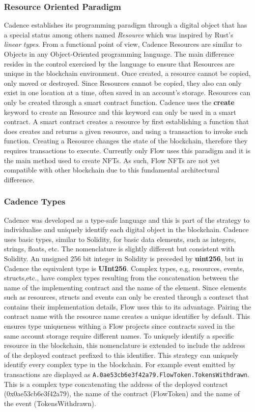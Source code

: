\documentclass[../NFTComp_IEEE.tex]{subfiles}
\begin{document}
\subsubsection{Resource Oriented Paradigm}
Cadence establishes its programming paradigm through a digital object that has a special status among others named \textit{Resource} which was inspired by Rust's \textit{linear types}. From a functional point of view, Cadence Resources are similar to Objects in any Object-Oriented programming language. The main difference resides in the control exercised by the language to ensure that Resources are unique in the blockchain environment. Once created, a resource cannot be copied, only moved or destroyed. Since Resources cannot be copied, they also can only exist in one location at a time, often saved in an account's storage. Resources can only be created through a smart contract function. Cadence uses the \textbf{create} keyword to create an Resource and this keyword can only be used in a smart contract. A smart contract creates a resource by first establishing a function that does creates and returns a given resource, and using a transaction to invoke such function. Creating a Resource changes the state of the blockchain, therefore they requires transactions to execute. Currently only Flow uses this paradigm and it is the main method used to create NFTs. As such, Flow NFTs are not yet compatible with other blockchain due to this fundamental architectural difference.

\subsubsection{Cadence Types}
Cadence was developed as a type-safe language and this is part of the strategy to individualise and uniquely identify each digital object in the blockchain. Cadence uses basic types, similar to Solidity, for basic data elements, such as integers, strings, floats, etc. The nomenclature is slightly different but consistent with Solidity. An unsigned 256 bit integer in Solidity is preceded by \textbf{uint256}, but in Cadence the equivalent type is \textbf{UInt256}. Complex types, e.g, resources, events, structs,etc., have complex types resulting from the concatenation between the name of the implementing contract and the name of the element. Since elements such as resources, structs and events can only be created through a contract that contains their implementation details, Flow uses this to its advantage. Pairing the contract name with the resource name creates a unique identifier by default. This ensures type uniqueness withing a Flow projects since contracts saved in the same account storage require different names. To uniquely identify a specific resource in the blockchain, this nomenclature is extended to include the address of the deployed contract prefixed to this identifier. This strategy can uniquely identify every complex type in the blockchain. For example event emitted by transactions are displayed as \verb|A.0ae53cb6e3f42a79.FlowToken.TokensWithdrawn|. This is a complex type concatenating the address of the deployed contract (0x0ae53cb6e3f42a79), the name of the contract (FlowToken) and the name of the event (TokensWithdrawn).
\end{document}
